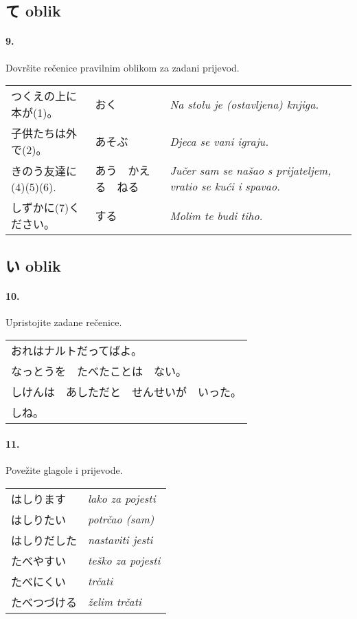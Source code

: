 \documentclass[12pt]{article}
\begin{document}
	\newpage
	\subsection{て oblik}
	
	\paragraph{9.} Dovršite rečenice pravilnim oblikom za zadani prijevod.
	
	\begin{tabularx}{\textwidth}{X X X}
		つくえの上に本が(1)。&おく& \textit{Na stolu je (ostavljena) knjiga.}\\
		子供たちは外で(2)。&あそぶ& \textit{Djeca se vani igraju.}\\
		きのう友達に(4)(5)(6).&あう　かえる　ねる&\textit{Jučer sam se našao s prijateljem, vratio se kući i spavao.}\\
		しずかに(7)ください。&する&\textit{Molim te budi tiho.}\\
	\end{tabularx}

	\subsection{い oblik}
	
	\paragraph{10.} Upristojite zadane rečenice.
	
	\begin{tabularx}{\textwidth}{X}
		おれはナルトだってばよ。\\
		なっとうを　たべたことは　ない。\\
		しけんは　あしただと　せんせいが　いった。\\
		しね。\\
	\end{tabularx}

	\paragraph{11.} Povežite glagole i prijevode.
	
	\begin{tabularx}{\textwidth}{X X}
		はしります&\textit{lako za pojesti}\\
		はしりたい&\textit{potrčao (sam)}\\
		はしりだした&\textit{nastaviti jesti}\\
		たべやすい&\textit{teško za pojesti}\\
		たべにくい&\textit{trčati}\\
		たべつづける&\textit{želim trčati}\\
	\end{tabularx}
\end{document}
